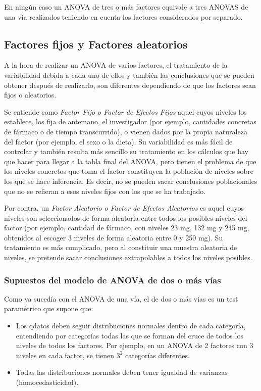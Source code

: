 \documentclass[
  a4paper,
]{scrreport}
\theoremstyle{plain}
\theoremstyle{definition}
\theoremstyle{definition}
\theoremstyle{remark}
\begin{document}
En ningún caso un ANOVA de tres o más factores equivale a tres ANOVAS de
una vía realizados teniendo en cuenta los factores considerados por
separado.

\subsection{Factores fijos y Factores
aleatorios}\label{factores-fijos-y-factores-aleatorios}

A la hora de realizar un ANOVA de varios factores, el tratamiento de la
variabilidad debida a cada uno de ellos y también las conclusiones que
se pueden obtener después de realizarlo, son diferentes dependiendo de
que los factores sean fijos o aleatorios.

Se entiende como \emph{Factor Fijo o Factor de Efectos Fijos} aquel
cuyos niveles los establece, los fija de antemano, el investigador (por
ejemplo, cantidades concretas de fármaco o de tiempo transcurrido), o
vienen dados por la propia naturaleza del factor (por ejemplo, el sexo o
la dieta). Su variabilidad es más fácil de controlar y también resulta
más sencillo su tratamiento en los cálculos que hay que hacer para
llegar a la tabla final del ANOVA, pero tienen el problema de que los
niveles concretos que toma el factor constituyen la población de niveles
sobre los que se hace inferencia. Es decir, no se pueden sacar
conclusiones poblacionales que no se refieran a esos niveles fijos con
los que se ha trabajado.

Por contra, un \emph{Factor Aleatorio o Factor de Efectos Aleatorios} es
aquel cuyos niveles son seleccionados de forma aleatoria entre todos los
posibles niveles del factor (por ejemplo, cantidad de fármaco, con
niveles 23 mg, 132 mg y 245 mg, obtenidos al escoger 3 niveles de forma
aleatoria entre 0 y 250 mg). Su tratamiento es más complicado, pero al
constituir una muestra aleatoria de niveles, se pretende sacar
conclusiones extrapolables a todos los niveles posibles.

\subsubsection{Supuestos del modelo de ANOVA de dos o más
vías}\label{supuestos-del-modelo-de-anova-de-dos-o-muxe1s-vuxedas}

Como ya sucedía con el ANOVA de una vía, el de dos o más vías es un test
paramétrico que supone que:

\begin{itemize}
\item
  Los qdatos deben seguir distribuciones normales dentro de cada
  categoría, entendiendo por categorías todas las que se forman del
  cruce de todos los niveles de todos los factores. Por ejemplo, en un
  ANOVA de 2 factores con 3 niveles en cada factor, se tienen \(3^2\)
  categorías diferentes.
\item
  Todas las distribuciones normales deben tener igualdad de varianzas
  (homocedasticidad).
\end{itemize}
\end{document}
